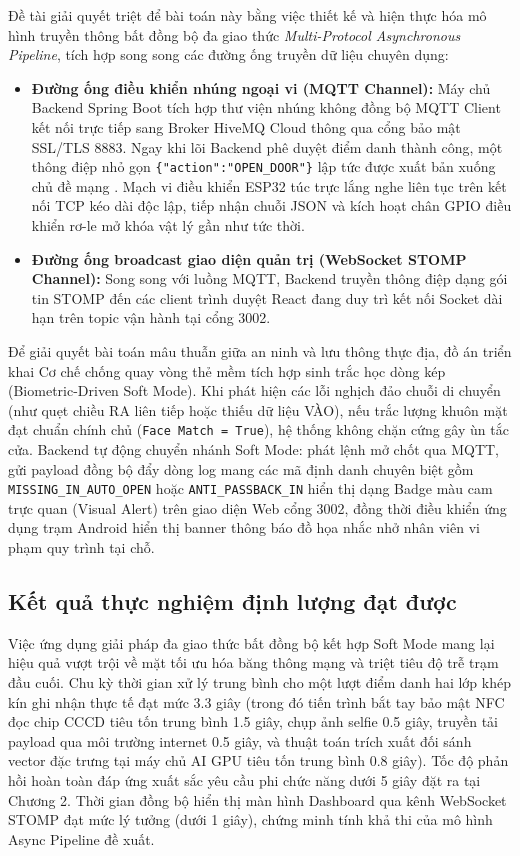 ﻿\documentclass[../DoAn.tex]{subfiles}
\begin{document}
Đề tài giải quyết triệt để bài toán này bằng việc thiết kế và hiện thực hóa mô hình truyền thông bất đồng bộ đa giao thức \textit{Multi-Protocol Asynchronous Pipeline}, tích hợp song song các đường ống truyền dữ liệu chuyên dụng:
\begin{itemize}
    \item \textbf{Đường ống điều khiển nhúng ngoại vi (MQTT Channel):} Máy chủ Backend Spring Boot tích hợp thư viện nhúng không đồng bộ MQTT Client kết nối trực tiếp sang Broker HiveMQ Cloud thông qua cổng bảo mật SSL/TLS 8883. Ngay khi lõi Backend phê duyệt điểm danh thành công, một thông điệp nhỏ gọn \texttt{\{"action":"OPEN\_DOOR"\}} lập tức được xuất bản xuống chủ đề mạng . Mạch vi điều khiển ESP32 túc trực lắng nghe liên tục trên kết nối TCP kéo dài độc lập, tiếp nhận chuỗi JSON và kích hoạt chân GPIO điều khiển rơ-le mở khóa vật lý gần như tức thời.
    \item \textbf{Đường ống broadcast giao diện quản trị (WebSocket STOMP Channel):} Song song với luồng MQTT, Backend truyền thông điệp dạng gói tin STOMP đến các client trình duyệt React đang duy trì kết nối Socket dài hạn trên topic  vận hành tại cổng 3002. 
\end{itemize}

Để giải quyết bài toán mâu thuẫn giữa an ninh và lưu thông thực địa, đồ án triển khai Cơ chế chống quay vòng thẻ mềm tích hợp sinh trắc học dòng kép (Biometric-Driven Soft Mode). Khi phát hiện các lỗi nghịch đảo chuỗi di chuyển (như quẹt chiều RA liên tiếp hoặc thiếu dữ liệu VÀO), nếu trắc lượng khuôn mặt đạt chuẩn chính chủ (\texttt{Face Match = True}), hệ thống không chặn cứng gây ùn tắc cửa. Backend tự động chuyển nhánh Soft Mode: phát lệnh mở chốt qua MQTT, gửi payload đồng bộ đẩy dòng log mang các mã định danh chuyên biệt gồm \texttt{MISSING\_IN\_AUTO\_OPEN} hoặc \texttt{ANTI\_PASSBACK\_IN} hiển thị dạng Badge màu cam trực quan (Visual Alert) trên giao diện Web cổng 3002, đồng thời điều khiển ứng dụng trạm Android hiển thị banner thông báo đồ họa nhắc nhở nhân viên vi phạm quy trình tại chỗ.

\subsection{Kết quả thực nghiệm định lượng đạt được}

Việc ứng dụng giải pháp đa giao thức bất đồng bộ kết hợp Soft Mode mang lại hiệu quả vượt trội về mặt tối ưu hóa băng thông mạng và triệt tiêu độ trễ trạm đầu cuối. Chu kỳ thời gian xử lý trung bình cho một lượt điểm danh hai lớp khép kín ghi nhận thực tế đạt mức 3.3 giây (trong đó tiến trình bắt tay bảo mật NFC đọc chip CCCD tiêu tốn trung bình 1.5 giây, chụp ảnh selfie 0.5 giây, truyền tải payload qua môi trường internet 0.5 giây, và thuật toán trích xuất đối sánh vector đặc trưng tại máy chủ AI GPU tiêu tốn trung bình 0.8 giây). Tốc độ phản hồi hoàn toàn đáp ứng xuất sắc yêu cầu phi chức năng dưới 5 giây đặt ra tại Chương 2. Thời gian đồng bộ hiển thị màn hình Dashboard qua kênh WebSocket STOMP đạt mức lý tưởng (dưới 1 giây), chứng minh tính khả thi của mô hình Async Pipeline đề xuất.
\end{document}
